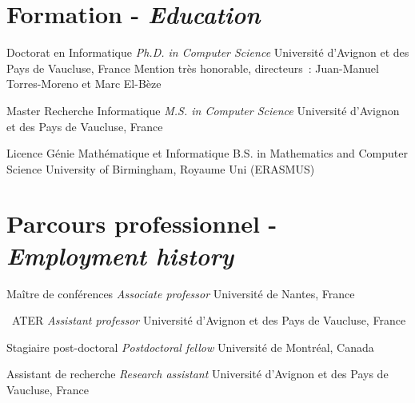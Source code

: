 \documentclass[11pt,a4paper]{moderncv}
\begin{document}
\makecvtitle

\setlength{\hintscolumnwidth}{2.2cm}

\section{Formation - \textit{Education}}

        {Doctorat en Informatique}
        {\textit{Ph.D. in Computer Science}}
        {}{}
        {Université d'Avignon et des Pays de Vaucluse, France \newline
        Mention très honorable, directeurs~: 
        Juan-Manuel Torres-Moreno et Marc El-Bèze}

        {Master Recherche Informatique}
        {\textit{M.S. in Computer Science}}
        {}{}
        {Université d'Avignon et des Pays de Vaucluse, France}

        {Licence Génie Mathématique et Informatique}
        {B.S. in Mathematics and Computer Science}
        {}{}
        {University of Birmingham, Royaume Uni (ERASMUS)} 

\section{Parcours professionnel - \textit{Employment history}}

        {Maître de conférences}
        {\textit{Associate professor}}
        {}{}
        {Université de Nantes, France}

        {\textonehalf~ATER}
        {\textit{Assistant professor}}
        {}{}
        {Université d'Avignon et des Pays de Vaucluse, France}

        {Stagiaire post-doctoral}
        {\textit{Postdoctoral fellow}}
        {}{}
        {Université de Montréal, Canada}

        {Assistant de recherche}
        {\textit{Research assistant}}
        {}{}
        {Université d'Avignon et des Pays de Vaucluse, France}   

\end{document}
